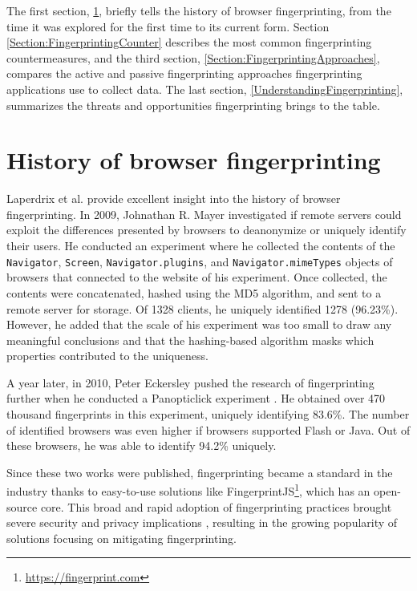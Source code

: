 The first section, \ref{Section:FingerprintingHistory}, briefly tells the history of browser fingerprinting, from the time it was explored for the first time to its current form. Section \ref{Section:FingerprintingCounter} describes the most common fingerprinting countermeasures, and the third section, \ref{Section:FingerprintingApproaches}, compares the active and passive fingerprinting approaches fingerprinting applications use to collect data. The last section, \ref{UnderstandingFingerprinting}, summarizes the threats and opportunities fingerprinting brings to the table.

\section{History of browser fingerprinting}
\label{Section:FingerprintingHistory}

Laperdrix et al. \cite{FingerprintingSurvey} provide excellent insight into the history of browser fingerprinting. In 2009, Johnathan R. Mayer investigated \cite{MayerAnyPerson} if remote servers could exploit the differences presented by browsers to deanonymize or uniquely identify their users. He conducted an experiment where he collected the contents of the \texttt{Navigator}, \texttt{Screen}, \texttt{Navigator.plugins}, and \texttt{Navigator.mimeTypes} objects of browsers that connected to the website of his experiment. Once collected, the contents were concatenated, hashed using the MD5 algorithm, and sent to a remote server for storage. Of 1328 clients, he uniquely identified 1278 (96.23\%). However, he added that the scale of his experiment was too small to draw any meaningful conclusions and that the hashing-based algorithm masks which properties contributed to the uniqueness.

A year later, in 2010, Peter Eckersley pushed the research of fingerprinting further when he conducted a Panopticlick experiment \cite{EckersleyHowUnique}. He obtained over 470 thousand fingerprints in this experiment, uniquely identifying 83.6\%. The number of identified browsers was even higher if browsers supported Flash or Java. Out of these browsers, he was able to identify 94.2\% uniquely.

Since these two works were published, fingerprinting became a standard in the industry thanks to easy-to-use solutions like FingerprintJS\footnote{\url{https://fingerprint.com}}, which has an open-source core. This broad and rapid adoption of fingerprinting practices brought severe security and privacy implications \cite{WP224Fingerprinting}, resulting in the growing popularity of solutions focusing on mitigating fingerprinting.

